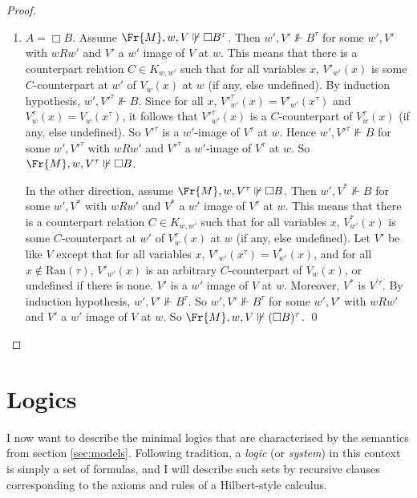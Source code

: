 \documentclass[11pt]{woarticle}
\newcommand{\cmnt}[1]{\iffalse #1 \fi}
\theoremstyle{break}
\theoremstyle{nonumberplain}
\newcommand{\SAT}{\Vdash}
\newcommand{\1}{\;\,|\;\,}
\begin{document}
\begin{proof}
\begin{enumerate}
  \item $A = \Box B$. Assume $\Fr{M},w,V \not\SAT \Box B^\tau$. Then $w',V'
    \not\SAT B^\tau$ for some $w',V'$ with $wRw'$ and $V'$ a $w'$
    image of $V$ at $w$. This means that there is a counterpart
    relation $C\in K_{w,w'}$ such that for all variables $x$,
    $V'_{w'}(x)$ is some $C$-counterpart at $w'$ of $V_w(x)$ at $w$
    (if any, else undefined). By induction hypothesis, $w',{V'}^\tau
    \not\SAT B$. Since for all $x$, ${V'}^\tau_{w'}(x) =
    V'_{w'}(x^\tau)$ and $V^\tau_{w}(x) = V_{w}(x^\tau)$, it follows
    that ${V'}^\tau_{w'}(x)$ is a $C$-counterpart of $V^\tau_w(x)$ (if
    any, else undefined). So ${V'}^\tau$ is a $w'$-image of $V^\tau$
    at $w$. Hence $w',{V'}^\tau \not\SAT B$ for some $w',{V'}^\tau$
    with $wRw'$ and ${V'}^\tau$ a $w'$-image of ${V^\tau}$ at $w$. So
    $\Fr{M},w,V^\tau \not\SAT \Box B$.

    In the other direction, assume $\Fr{M},w,V^\tau \not\SAT \Box B$. Then
    $w',V^* \not\SAT B$ for some $w',V^*$ with $wRw'$ and $V^*$ a $w'$
    image of $V^\tau$ at $w$. This means that there is a counterpart
    relation $C\in K_{w,w'}$ such that for all variables $x$,
    $V^*_{w'}(x)$ is some $C$-counterpart at $w'$ of $V^\tau_w(x)$ at
    $w$ (if any, else undefined). Let $V'$ be like $V$ except that for
    all variables $x$, $V'_{w'}(x^\tau) = V^*_{w'}(x)$, and for all $x
    \not\in \text{Ran}(\tau)$, $V'_{w'}(x)$ is an arbitrary
    $C$-counterpart of $V_{w}(x)$, or undefined if there is
    none. $V'$ is a $w'$ image of $V$ at $w$. Moreover, $V^*$ is
    $V^{\prime \tau}$. By induction hypothesis, $w',V' \not\SAT
    B^\tau$. So $w',V' \not\SAT B^\tau$ for some $w',V'$ with $wRw'$
    and $V'$ a $w'$ image of $V$ at $w$. So $\Fr{M},w,V \not\SAT (\Box
    B)^\tau$. \qed

    \cmnt{
      Here I use the fact that $V^\tau$ modifies $V$ relative to all
      worlds.
    }

  \end{enumerate}
\end{proof}

\section{Logics}\label{sec:logics}

I now want to describe the minimal logics that are characterised by the
semantics from section \ref{sec:models}. Following tradition, a \emph{logic} (or
\emph{system}) in this context is simply a set of formulas, and I will describe
such sets by recursive clauses corresponding to the axioms and rules of a
Hilbert-style calculus.
\end{document}
